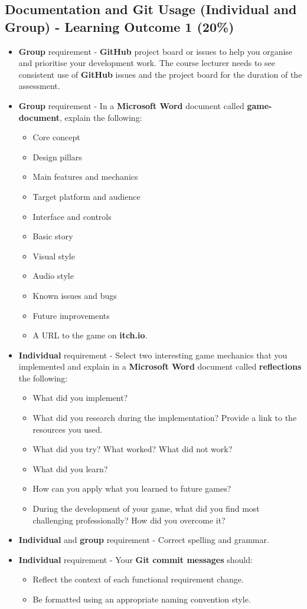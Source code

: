 \documentclass{article}
\begin{document}
\subsection*{Documentation and Git Usage (Individual and Group) - Learning Outcome 1 (20\%)}
\begin{itemize}
	\item \textbf{Group} requirement - \textbf{GitHub} project board or issues to help you organise and prioritise your development work. The course lecturer needs to see consistent use of \textbf{GitHub} issues and the project board for the duration of the assessment.
	\item \textbf{Group} requirement - In a \textbf{Microsoft Word} document called \textbf{game-document}, explain the following: 
	\begin{itemize}
		\item Core concept
		\item Design pillars
		\item Main features and mechanics
		\item Target platform and audience
		\item Interface and controls
		\item Basic story
		\item Visual style
		\item Audio style
		\item Known issues and bugs
		\item Future improvements
		\item A URL to the game on \textbf{itch.io}.
	\end{itemize}
	\item \textbf{Individual} requirement - Select two interesting game mechanics that you implemented and explain in a \textbf{Microsoft Word} document called \textbf{reflections} the following:
		\begin{itemize}
			\item What did you implement?
			\item What did you research during the implementation? Provide a link to the resources you used.
			\item What did you try? What worked? What did not work?
			\item What did you learn?
			\item How can you apply what you learned to future games?
			\item During the development of your game, what did you find most challenging professionally? How did you overcome it?
		\end{itemize}
    \item \textbf{Individual} and \textbf{group} requirement - Correct spelling and grammar.
    \item \textbf{Individual} requirement - Your \textbf{Git commit messages} should:
    \begin{itemize}
      \item Reflect the context of each functional requirement change.
      \item Be formatted using an appropriate naming convention style.
    \end{itemize}
\end{itemize} 
\end{document}
